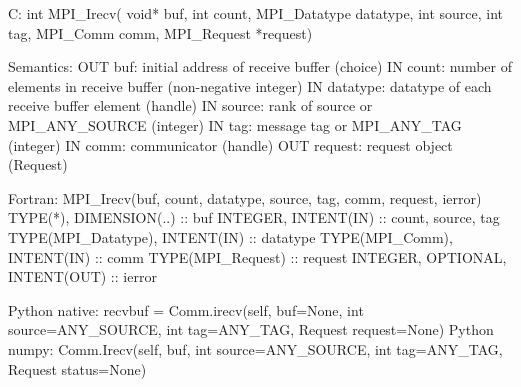 C:
int MPI_Irecv(
  void* buf, int count, MPI_Datatype datatype,
  int source, int tag, MPI_Comm comm, MPI_Request *request)

Semantics:
OUT buf: initial address of receive buffer (choice)
IN count: number of elements in receive buffer (non-negative integer)
IN datatype: datatype of each receive buffer element (handle)
IN source: rank of source or MPI_ANY_SOURCE (integer)
IN tag: message tag or MPI_ANY_TAG (integer)
IN comm: communicator (handle)
OUT request: request object (Request)

Fortran:
MPI_Irecv(buf, count, datatype, source, tag, comm, request, ierror)
TYPE(*), DIMENSION(..) :: buf
INTEGER, INTENT(IN) :: count, source, tag
TYPE(MPI_Datatype), INTENT(IN) :: datatype
TYPE(MPI_Comm), INTENT(IN) :: comm
TYPE(MPI_Request) :: request
INTEGER, OPTIONAL, INTENT(OUT) :: ierror

Python native:
recvbuf = Comm.irecv(self, buf=None, int source=ANY_SOURCE, int tag=ANY_TAG,
    Request request=None)
Python numpy:
Comm.Irecv(self, buf, int source=ANY_SOURCE, int tag=ANY_TAG,
    Request status=None)
